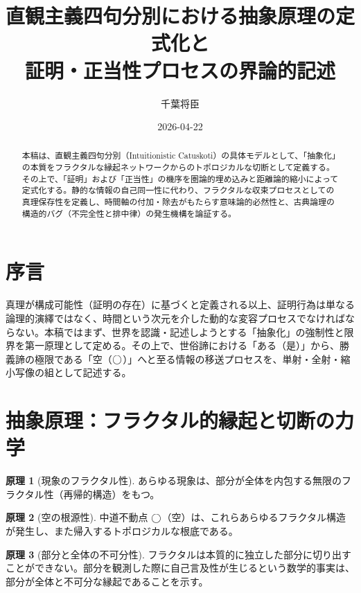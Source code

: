\documentclass[11pt,a4paper]{article}
\theoremstyle{definition}
\newtheorem{principle}{原理}[section]
\begin{document}
\title{直観主義四句分別における抽象原理の定式化と\\証明・正当性プロセスの界論的記述}
\author{千葉将臣}
\date{2026-04-22}
\maketitle

\begin{abstract}
本稿は、直観主義四句分別（Intuitionistic Catuskoti）の具体モデルとして、「抽象化」の本質をフラクタルな縁起ネットワークからのトポロジカルな切断として定義する。その上で、「証明」および「正当性」の機序を圏論的埋め込みと距離論的縮小によって定式化する。静的な情報の自己同一性に代わり、フラクタルな収束プロセスとしての真理保存性を定義し、時間軸の付加・除去がもたらす意味論的必然性と、古典論理の構造的バグ（不完全性と排中律）の発生機構を論証する。
\end{abstract}

\section*{序言}
真理が構成可能性（証明の存在）に基づくと定義される以上、証明行為は単なる論理的演繹ではなく、時間という次元を介した動的な変容プロセスでなければならない。本稿ではまず、世界を認識・記述しようとする「抽象化」の強制性と限界を第一原理として定める。その上で、世俗諦における「ある（是）」から、勝義諦の極限である「空（$\bigcirc$）」へと至る情報の移送プロセスを、単射・全射・縮小写像の組として記述する。

\section{抽象原理：フラクタル的縁起と切断の力学}

\begin{principle}[現象のフラクタル性]
あらゆる現象は、部分が全体を内包する無限のフラクタル性（再帰的構造）をもつ。
\end{principle}

\begin{principle}[空の根源性]
中道不動点 $\bigcirc$（空）は、これらあらゆるフラクタル構造が発生し、また帰入するトポロジカルな根底である。
\end{principle}

\begin{principle}[部分と全体の不可分性]
フラクタルは本質的に独立した部分に切り出すことができない。部分を観測した際に自己言及性が生じるという数学的事実は、部分が全体と不可分な縁起であることを示す。
\end{principle}
\end{document}

